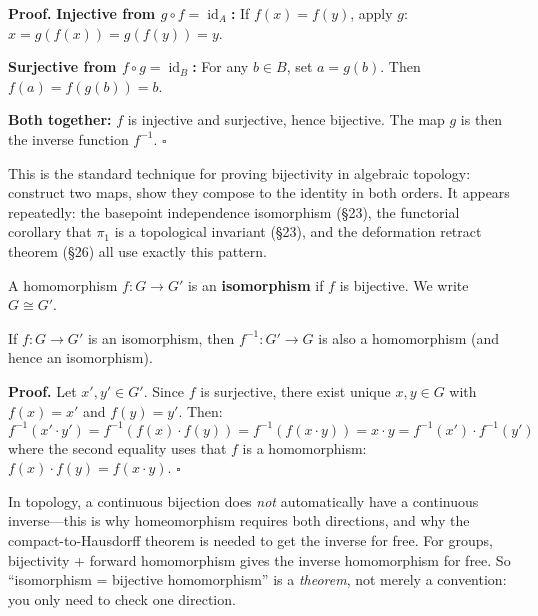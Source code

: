\documentclass[11pt]{report}
\renewenvironment{proof}[1][Proof]{\noindent\textbf{#1.} }{\hfill$\square$\par\vspace{5pt}}
\begin{document}
\begin{proof}
\textbf{Injective from $g \circ f = \operatorname{id}_A$:} If $f(x) = f(y)$, apply $g$: $x = g(f(x)) = g(f(y)) = y$.

\textbf{Surjective from $f \circ g = \operatorname{id}_B$:} For any $b \in B$, set $a = g(b)$. Then $f(a) = f(g(b)) = b$.

\textbf{Both together:} $f$ is injective and surjective, hence bijective. The map $g$ is then the inverse function $f^{-1}$.
\end{proof}

\begin{rembox}
This is the standard technique for proving bijectivity in algebraic topology: construct two maps, show they compose to the identity in both orders. It appears repeatedly: the basepoint independence isomorphism (\S 23), the functorial corollary that $\pi_1$ is a topological invariant (\S 23), and the deformation retract theorem (\S 26) all use exactly this pattern.
\end{rembox}

\begin{defbox}[Isomorphism]
A homomorphism $f: G \to G'$ is an \textbf{isomorphism} if $f$ is bijective. We write $G \cong G'$.
\end{defbox}

\begin{thmbox}
If $f: G \to G'$ is an isomorphism, then $f^{-1}: G' \to G$ is also a homomorphism (and hence an isomorphism).
\end{thmbox}

\begin{proof}
Let $x', y' \in G'$. Since $f$ is surjective, there exist unique $x, y \in G$ with $f(x) = x'$ and $f(y) = y'$. Then:
\[f^{-1}(x' \cdot y') = f^{-1}(f(x) \cdot f(y)) = f^{-1}(f(x \cdot y)) = x \cdot y = f^{-1}(x') \cdot f^{-1}(y')\]
where the second equality uses that $f$ is a homomorphism: $f(x) \cdot f(y) = f(x \cdot y)$.
\end{proof}

\begin{rembox}
In topology, a continuous bijection does \emph{not} automatically have a continuous inverse---this is why homeomorphism requires both directions, and why the compact-to-Hausdorff theorem is needed to get the inverse for free. For groups, bijectivity + forward homomorphism gives the inverse homomorphism for free. So ``isomorphism = bijective homomorphism'' is a \emph{theorem}, not merely a convention: you only need to check one direction.
\end{rembox}
\end{document}
